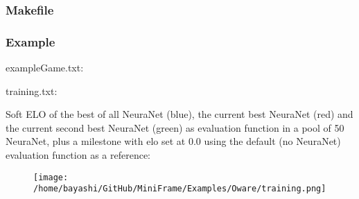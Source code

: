 \begin{scriptsize}
\begin{ttfamily}

\end{ttfamily}
\end{scriptsize}

\subsubsection{Makefile}

\begin{scriptsize}
\begin{ttfamily}

\end{ttfamily}
\end{scriptsize}

\subsubsection{Example}

exampleGame.txt:\\
\begin{scriptsize}
\begin{ttfamily}

\end{ttfamily}
\end{scriptsize}

training.txt:\\
\begin{scriptsize}
\begin{ttfamily}

\end{ttfamily}
\end{scriptsize}

Soft ELO of the best of all NeuraNet (blue), the current best NeuraNet (red) and the current second best NeuraNet (green) as evaluation function in a pool of 50 NeuraNet, plus a milestone with elo set at 0.0 using the default (no NeuraNet) evaluation function as a reference:\\

\begin{center}
\begin{figure}[H]
\centering\texttt{[image: /home/bayashi/GitHub/MiniFrame/Examples/Oware/training.png]}\\
\end{figure}
\end{center}
